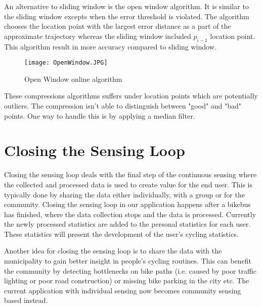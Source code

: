 An alternative to sliding window is the open window algorithm. It is similar to the sliding window excepts when the error threshold is violated. The algorithm chooses the location point with the largest error distance as a part of the approximate trajectory whereas the sliding window included $p_{i-1}$ location point. This algorithm result in more accuracy compared to sliding window. 

\begin{figure}[H]
\centering
\texttt{[image: OpenWindow.JPG]}

\caption{Open Window online algorithm}
\label{fig:open_window_algorithm}
\end{figure}

These compressions algorithms suffers under location points which are potentially outliers. The compression isn't able to distinguish between "good" and "bad" points. One way to handle this is by applying a median filter. 

\iffalse
Suggestions for further processing:
\begin{itemize}
    \item Median filtering
    \item Advanced statistics calculations (analyse per interval)
    \item Algorithm to balance the trade-off between processing space and time (Appendix \ref{app:processing_algorithm})
\end{itemize}
\fi

\section{Closing the Sensing Loop}
Closing the sensing loop deals with the final step of the continuous sensing where the collected and processed data is used to create value for the end user.
This is typically done by sharing the data either individually, with a group or for the community. 
Closing the sensing loop in our application happens after a bikebus has finished, where the data collection stops and the data is processed. Currently the newly processed statistics are added to the personal statistics for each user. These statistics will present the development of the user's cycling statistics.

Another idea for closing the sensing loop is to share the data with the municipality to gain better insight in people's cycling routines. This can benefit the community by detecting bottlenecks on bike paths (i.e. caused by poor traffic lighting or poor road construction) or missing bike parking in the city etc. 
The current application with individual sensing now becomes community sensing based instead.

